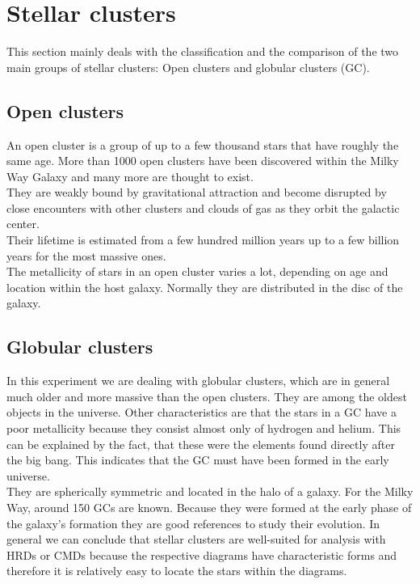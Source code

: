  \section{Stellar clusters}
 This section mainly deals with the classification and the comparison of the two main groups of stellar clusters: Open clusters and globular clusters (GC).
 \subsection{Open clusters}
An open cluster is a group of up to a few thousand stars that  have roughly the same age. More than 1000 open clusters have been discovered within the Milky Way Galaxy and many more are thought to exist. \\
  They are weakly bound by gravitational attraction and become disrupted by close encounters with other clusters and clouds of gas as they orbit the galactic center. \\
  Their lifetime is estimated from a few hundred million years up to a few billion years for the most massive ones. \\
  The metallicity of stars in an open cluster varies a lot, depending on age and location within the host galaxy. Normally they are distributed in the disc of the galaxy.
 \subsection{Globular clusters}
 In this experiment we are dealing with globular clusters, which are in general much older and more massive than the open clusters. They are among the oldest objects in the universe. Other characteristics are that the stars in a GC have a poor metallicity because they consist almost only of hydrogen and helium. This can be explained by the fact, that these were the elements found directly after the big bang. This indicates that the GC must have been formed in the early universe. \\
 They are spherically symmetric and located in the halo of a galaxy. For the Milky Way, around 150 GCs are known. Because they were formed at the early phase of the galaxy's formation they are good references to study their evolution.
 In general we can conclude that stellar clusters are well-suited for analysis with HRDs or CMDs because the respective diagrams have characteristic forms and therefore it is relatively easy to locate the stars within the diagrams.